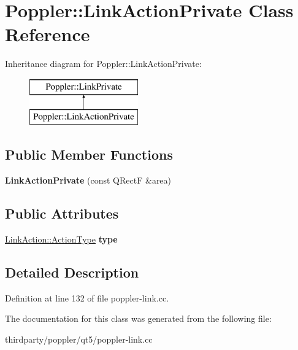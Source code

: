 \hypertarget{class_poppler_1_1_link_action_private}{}\section{Poppler\+:\+:Link\+Action\+Private Class Reference}
\label{class_poppler_1_1_link_action_private}
Inheritance diagram for Poppler\+:\+:Link\+Action\+Private\+:\begin{figure}[H]
\begin{center}
\leavevmode
\includegraphics[height=2.000000cm]{class_poppler_1_1_link_action_private}
\end{center}
\end{figure}
\subsection*{Public Member Functions}
\begin{DoxyCompactItemize}
\item 
\mbox{\label{class_poppler_1_1_link_action_private_a389d796ba1f4375fb6cd80afa4cd3fa7}} 
{\bfseries Link\+Action\+Private} (const Q\+RectF \&area)
\end{DoxyCompactItemize}
\subsection*{Public Attributes}
\begin{DoxyCompactItemize}
\item 
\mbox{\label{class_poppler_1_1_link_action_private_aa3bf78a5b7d491560db0db7d5bd2323b}} 
\hyperlink{class_poppler_1_1_link_action_af9c6ee08681c0993083a6f817f9d099c}{Link\+Action\+::\+Action\+Type} {\bfseries type}
\end{DoxyCompactItemize}


\subsection{Detailed Description}


Definition at line 132 of file poppler-\/link.\+cc.



The documentation for this class was generated from the following file\+:\begin{DoxyCompactItemize}
\item 
thirdparty/poppler/qt5/poppler-\/link.\+cc\end{DoxyCompactItemize}
